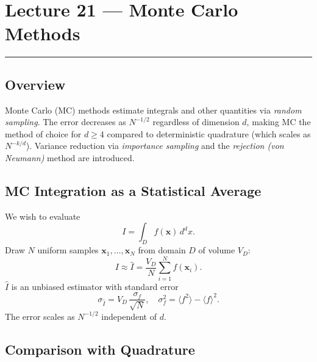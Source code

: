 
\section{Lecture 21 — Monte Carlo Methods}\label{sec:lec21}
\hrule\vspace{1.5em}

\subsection*{Overview}
Monte Carlo (MC) methods estimate integrals and other quantities
via \emph{random sampling}.  The error decreases as $N^{-1/2}$
regardless of dimension $d$, making MC the method of choice for
$d \ge 4$ compared to deterministic quadrature (which scales as
$N^{-k/d}$).  Variance reduction via \emph{importance sampling}
and the \emph{rejection (von Neumann)} method are introduced.

\subsection{MC Integration as a Statistical Average}\label{subsec:lec21:basic}

We wish to evaluate
\begin{equation}
  I = \int_D f(\mathbf{x})\,d^d x.
  \label{eq:lec21:integral}
\end{equation}
Draw $N$ uniform samples $\mathbf{x}_1,\ldots,\mathbf{x}_N$ from
domain $D$ of volume $V_D$:
\begin{equation}
  I \approx \hat{I} = \frac{V_D}{N}\sum_{i=1}^{N}f(\mathbf{x}_i).
  \label{eq:lec21:estimate}
\end{equation}
$\hat{I}$ is an unbiased estimator with standard error
\begin{equation}
  \sigma_{\hat{I}} = V_D\,\frac{\sigma_f}{\sqrt{N}},
  \quad
  \sigma_f^2 = \langle f^2\rangle - \langle f\rangle^2.
  \label{eq:lec21:error}
\end{equation}
The error scales as $N^{-1/2}$ independent of $d$.

\subsection{Comparison with Quadrature}\label{subsec:lec21:comparison}

